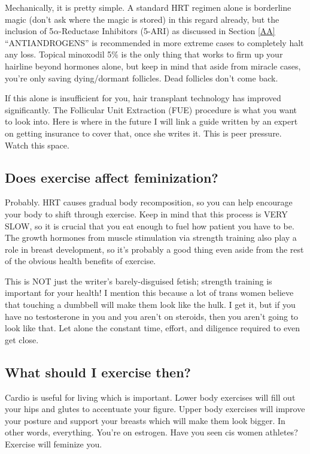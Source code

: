 \documentclass{article}
\begin{document}
Mechanically, it is pretty simple. A standard HRT regimen alone is borderline magic (don’t ask where the magic is stored) in this regard already, but the inclusion of 5$\alpha$-Reductase Inhibitors (5-ARI) as discussed in Section \ref{AA} “ANTIANDROGENS” is recommended in more extreme cases to completely halt any loss. Topical minoxodil 5\% is the only thing that works to firm up your hairline beyond hormones alone, but keep in mind that aside from miracle cases, you’re only saving dying/dormant follicles. Dead follicles don’t come back.

If this alone is insufficient for you, hair transplant technology has improved significantly. The Follicular Unit Extraction (FUE) procedure is what you want to look into. Here is where in the future I will link a guide written by an expert on getting insurance to cover that, once she writes it. This is peer pressure. Watch this space.

\subsection{Does exercise affect feminization?}

Probably. HRT causes gradual body recomposition, so you can help encourage your body to shift through exercise. Keep in mind that this process is VERY SLOW, so it is crucial that you eat enough to fuel how patient you have to be. The growth hormones from muscle stimulation via strength training also play a role in breast development, so it’s probably a good thing even aside from the rest of the obvious health benefits of exercise.

This is NOT just the writer’s barely-disguised fetish; strength training is important for your health! I mention this because a lot of trans women believe that touching a dumbbell will make them look like the hulk. I get it, but if you have no testosterone in you and you aren’t on steroids, then you aren’t going to look like that. Let alone the constant time, effort, and diligence required to even get close.

\subsection{What should I exercise then?}\label{11-16}

Cardio is useful for living which is important. Lower body exercises will fill out your hips and glutes to accentuate your figure. Upper body exercises will improve your posture and support your breasts which will make them look bigger. In other words, everything. You’re on estrogen. Have you seen cis women athletes? Exercise will feminize you.
\end{document}
